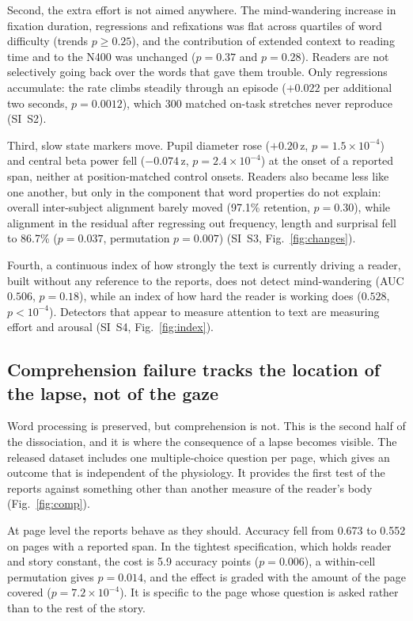 \documentclass[11pt]{article}
\begin{document}
Second, the extra effort is not aimed anywhere. The mind-wandering increase in fixation
duration, regressions and refixations was flat across quartiles of word difficulty (trends
$p\geq0.25$), and the contribution of extended context to reading time and to the N400 was
unchanged ($p=0.37$ and $p=0.28$). Readers are not selectively going back over the words that
gave them trouble. Only regressions accumulate: the rate climbs steadily through an episode
($+0.022$ per additional two seconds, $p=0.0012$), which 300 matched on-task stretches never
reproduce (SI~S2).

Third, slow state markers move. Pupil diameter rose ($+0.20$\,z, $p=1.5\times10^{-4}$) and
central beta power fell ($-0.074$\,z, $p=2.4\times10^{-4}$) at the onset of a reported span,
neither at position-matched control onsets. Readers also became less like one another, but only
in the component that word properties do not explain: overall inter-subject alignment barely
moved (97.1\% retention, $p=0.30$), while alignment in the residual after regressing out
frequency, length and surprisal fell to 86.7\% ($p=0.037$, permutation $p=0.007$)
(SI~S3, Fig.~\ref{fig:changes}).

Fourth, a continuous index of how strongly the text is currently driving a reader, built without
any reference to the reports, does not detect mind-wandering (AUC $0.506$, $p=0.18$), while an
index of how hard the reader is working does ($0.528$, $p<10^{-4}$). Detectors that appear to
measure attention to text are measuring effort and arousal (SI~S4, Fig.~\ref{fig:index}).

\subsection{Comprehension failure tracks the location of the lapse, not of the gaze}
\label{sec:comp}

Word processing is preserved, but comprehension is not. This is the second half of the
dissociation, and it is where the consequence of a lapse becomes visible. The released dataset
includes one multiple-choice question per page, which gives an outcome that is independent of the
physiology. It provides the first test of the reports against something other than another
measure of the reader's body (Fig.~\ref{fig:comp}).

At page level the reports behave as they should. Accuracy fell from 0.673 to 0.552 on pages with
a reported span. In the tightest specification, which holds reader and story constant, the cost
is 5.9 accuracy points ($p=0.006$), a within-cell permutation gives $p=0.014$, and the effect is
graded with the amount of the page covered ($p=7.2\times10^{-4}$). It is specific to the page
whose question is asked rather than to the rest of the story.
\end{document}
